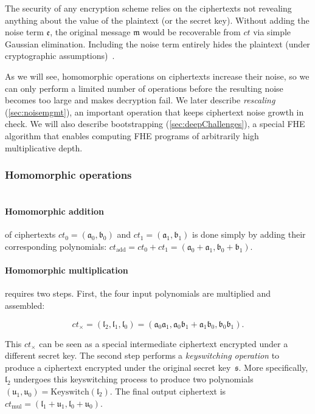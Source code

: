 The security of any encryption scheme relies on the ciphertexts not revealing
anything about the value of the plaintext (or the secret key). Without adding
the noise term $\mathfrak{e}$, the original message $\mathfrak{m}$ would be
recoverable from $ct$ via simple Gaussian elimination. Including the noise term
entirely hides the plaintext (under cryptographic
assumptions)~\cite{lyubashevsky:tact10:ideal}.

As we will see, homomorphic operations on ciphertexts increase their noise, so
we can only perform a limited number of operations before the resulting noise
becomes too large and makes decryption fail.  We later describe
\emph{rescaling} (\autoref{sec:noisemgmt}), an important operation that keeps
ciphertext noise growth in check. We will also describe bootstrapping
(\autoref{sec:deepChallenges}), a special FHE algorithm that enables computing
FHE programs of arbitrarily high multiplicative depth.

\subsubsection{Homomorphic operations}

\paragraph{\\Homomorphic addition} of ciphertexts
$ct_0 = (\mathfrak{a}_{0}, \mathfrak{b}_{0})$ and
$ct_1 = (\mathfrak{a}_{1}, \mathfrak{b}_{1})$ is done simply by adding
their corresponding polynomials:
$ct_{\text{add}} = ct_0 + ct_1 = (\mathfrak{a}_0 + \mathfrak{a}_1,
\mathfrak{b}_0 + \mathfrak{b}_1)$.

\paragraph{Homomorphic multiplication} requires two steps.
First, the four input polynomials are multiplied and assembled:

\begin{equation*}
  ct_{\times} = (\mathfrak{l}_2, \mathfrak{l}_1, \mathfrak{l}_0) = (\mathfrak{a}_0\mathfrak{a}_1,
  \mathfrak{a}_0\mathfrak{b}_1 + \mathfrak{a}_1 \mathfrak{b}_0,
  \mathfrak{b}_0\mathfrak{b}_1) .
\end{equation*}

This $ct_{\times}$ can be seen as a special intermediate ciphertext encrypted
under a different secret key. The second step performs a \emph{keyswitch\-ing
op\-era\-tion} to produce a ciphertext encrypted under the original secret
key~$\mathfrak{s}$. More specifically, $\mathfrak{l}_2$ undergoes this
keyswitching process to produce two polynomials $(\mathfrak{u}_1,
\mathfrak{u}_0) = \textrm{Keyswitch}(\mathfrak{l}_2)$.  The final output
ciphertext is $ct_{\text{mul}} = (\mathfrak{l}_1 + \mathfrak{u}_1,
\mathfrak{l}_0 + \mathfrak{u}_0)$.

